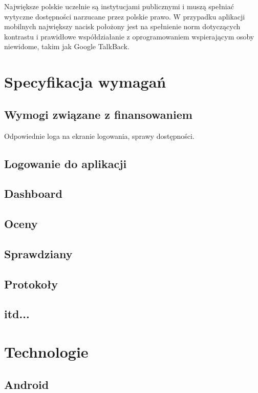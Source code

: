 \documentclass{pracamgr}
\begin{document}
Największe polskie uczelnie są instytucjami publicznymi i muszą spełniać wytyczne
dostępności narzucane przez polskie prawo. W przypadku aplikacji mobilnych
największy nacisk położony jest na spełnienie norm dotyczących kontrastu i prawidłowe
współdziałanie z oprogramowaniem wspierającym osoby niewidome, takim jak Google
TalkBack.

\chapter{Specyfikacja wymagań}

\section{Wymogi związane z finansowaniem}

Odpowiednie loga na ekranie logowania, sprawy dostępności.

\section{Logowanie do aplikacji}

\section{Dashboard}

\section{Oceny}

\section{Sprawdziany}

\section{Protokoły}

\section{itd...}

\chapter{Technologie}

\section{Android}
\end{document}
